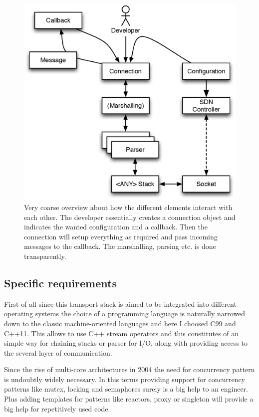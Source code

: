 \documentclass[twocolumn,english]{IEEEtran}
\theoremstyle{plain}
\theoremstyle{plain}
\begin{document}
\begin{figure}[h]
\includegraphics[width=\columnwidth]{Concept.eps}
\caption{Very coarse overview about how the different elements interact with
each other. The developer essentially creates a connection object and
indicates the wanted configuration and a callback. Then the connection will
setup everything as required and pass incoming messages to the callback. The
marshalling, parsing etc. is done transparently.}
\label{fig:concept}
\end{figure}

\subsection{Specific requirements}

First of all since this transport stack is aimed to be integrated into
different operating systems the choice of a programming language is naturally
narrowed down to the classic machine-oriented languages and here I choosed C99
and C++11. This allows to use C++ stream operators and this constitutes of an
simple way for chaining stacks or parser for I/O, along with providing access
to the several layer of communication.

Since the rise of multi-core architectures in
2004\cite{amd:first-multicore-x86} the need for concurrency pattern is
undoubtly widely necessary. In this terms providing support for concurrency
patterns like mutex, locking and semaphores surely is a big help to an
engineer. Plus adding templates for patterns like reactors, proxy or singleton
will provide a big help for repetitively used code.
\end{document}
